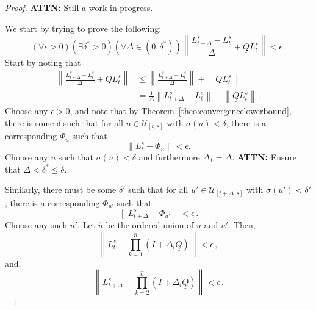 \documentclass[10pt]{paper}
\newcommand{\lrate}{\underline{Q}}
\newcommand{\norm}[1]{\left\lVert #1 \right\rVert}
\begin{document}
\begin{proof}
{\bf ATTN:} Still a work in progress.

We start by trying to prove the following:
\begin{equation*}
(\forall \epsilon>0)(\exists\delta^*>0)(\forall\Delta\in(0,\delta^*))\norm{\frac{L_{t+\Delta}^s - L_t^s}{\Delta} + \lrate L_t^s} < \epsilon\,.
\end{equation*}
Start by noting that
\begin{align*}
\norm{\frac{L_{t+\Delta}^s - L_t^s}{\Delta} + \lrate L_t^s} &\leq \norm{\frac{L_{t+\Delta}^s - L_t^s}{\Delta}} + \norm{\lrate L_t^s} \\
 &= \frac{1}{\Delta}\norm{L_{t+\Delta}^s - L_t^s} + \norm{\lrate L_t^s}\,.
\end{align*}
Choose any $\epsilon>0$, and note that by Theorem~\ref{theo:convergencelowerbound}, there is some $\delta$ such that for all $u\in\mathcal{U}_{[t,s]}$ with $\sigma(u)<\delta$, there is a corresponding $\Phi_u$ such that
\begin{equation*}
\norm{L_t^s - \Phi_u} < \epsilon.
\end{equation*}
Choose any $u$ such that $\sigma(u)<\delta$ and furthermore $\Delta_1 = \Delta$. {\bf ATTN:} Ensure that $\Delta<\delta^*\leq\delta$.

Similarly, there must be some $\delta'$ such that for all $u'\in\mathcal{U}_{[t+\Delta,s]}$ with $\sigma(u')<\delta'$, there is a corresponding $\Phi_{u'}$ such that
\begin{equation*}
\norm{L_{t+\Delta}^s - \Phi_{u'}} < \epsilon\,.
\end{equation*}
Choose any such $u'$.
Let $\hat{u}$ be the ordered union of $u$ and $u'$. Then,
\begin{equation*}
\norm{L_t^s - \prod_{k=1}^{\hat{n}}(I + \Delta_i\lrate)} < \epsilon\,,
\end{equation*}
and,
\begin{equation*}
\norm{L_{t+\Delta}^s - \prod_{k=2}^{\hat{n}}(I + \Delta_i\lrate)} < \epsilon\,.
\end{equation*}



\end{proof}
\end{document}
